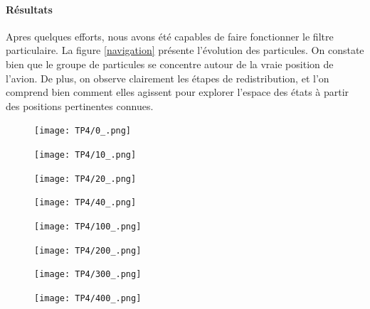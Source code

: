 \documentclass{article}
\begin{document}
 \paragraph{Résultats}
 Apres quelques efforts, nous avons été capables de faire fonctionner le 
 filtre particulaire. La figure \ref{navigation} présente l'évolution des
 particules. On constate bien que le groupe de particules se concentre autour de la 
 vraie position de l'avion. De plus, on observe clairement les étapes de redistribution,
 et l'on comprend bien comment elles agissent pour explorer l'espace des états à partir
 des positions pertinentes connues.
 

 \begin{figure}[h!]
   \centering
   \begin{minipage}[t]{5.5cm}
       \centering
       \texttt{[image: TP4/0\_.png]}
   \end{minipage}
   \begin{minipage}[t]{5.5cm}
       \centering
       \texttt{[image: TP4/10\_.png]}
   \end{minipage}
   \begin{minipage}[t]{5.5cm}
      \centering
      \texttt{[image: TP4/20\_.png]}
  \end{minipage}
  \begin{minipage}[t]{5.5cm}
   \centering
   \texttt{[image: TP4/40\_.png]}
\end{minipage}
\begin{minipage}[t]{5.5cm}
   \centering
   \texttt{[image: TP4/100\_.png]}
\end{minipage}
\begin{minipage}[t]{5.5cm}
   \centering
   \texttt{[image: TP4/200\_.png]}
\end{minipage}
\begin{minipage}[t]{5.5cm}
   \centering
   \texttt{[image: TP4/300\_.png]}
\end{minipage}
\begin{minipage}[t]{5.5cm}
   \centering
   \texttt{[image: TP4/400\_.png]}
\end{minipage}

\end{figure}
\end{document}
